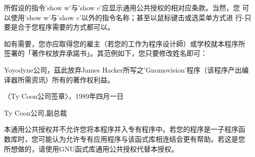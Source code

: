 所假设的指令'show w'与'show c'应显示通用公共授权的相对应条款。当然，您
可以使用'show w'与'show c'以外的指令名称；甚至以鼠标键击或选菜单方式进
行-只要是合于您程序需要的方式都可以。

如有需要，您亦应取得您的雇主（若您的工作为程序设计師）或学校就本程序所
签署的「著作权放弃承諾书」。其范例如下，您只要修改姓名即可：

Yoyodyne公司，茲此放弃James Hacker所写之'Gnomovision'程序（该程序产出编
译器所需资讯）所有的著作权利益。

〈Ty Coon公司签章〉，1989年四月一日

Ty Coon公司,副总裁

本通用公共授权并不允许您将本程序并入专有程序中。若您的程序是一子程序函
数库时，您可能认为允许专有应用程序与该函式库相连结会更有帮助。若这是您
所想做的，请使用GNU函式库通用公共授权代替本授权。

